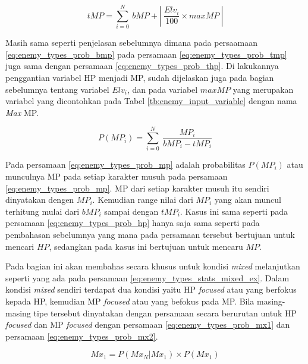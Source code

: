 \begin{equation}\label{eq:enemy_types_prob_tmp}
tMP = \sum_{i=0}^{N}\ bMP + \left |\ \frac{Elv_{i}}{100} \times maxMP\ \right |
\end{equation}

Masih sama seperti penjelasan sebelumnya dimana pada persaamaan \ref{eq:enemy_types_prob_bmp} pada persamaan \ref{eq:enemy_types_prob_tmp} juga sama dengan persamaan \ref{eq:enemy_types_prob_thp}. Di lakukannya penggantian variabel HP menjadi MP, sudah dijelaskan juga pada bagian sebelumnya tentang variabel $Elv_{i}$, dan pada variabel $maxMP$ yang merupakan variabel yang dicontohkan pada Tabel \ref{tb:enemy_input_variable} dengan nama \textit{Max} MP.
\vspace{2ex}

\begin{equation}\label{eq:enemy_types_prob_mp}
P(MP_{i}) = \sum_{i=0}^{N}\ \frac{MP_{i}}{bMP_{i} - tMP_{i}}
\end{equation}

Pada persamaan \ref{eq:enemy_types_prob_mp} adalah probabilitas $P(MP_{i})$ atau munculnya MP pada setiap karakter musuh pada persamaan \ref{eq:enemy_types_prob_mp}. MP dari setiap karakter musuh itu sendiri dinyatakan dengen $MP_{i}$. Kemudian range nilai dari $MP_{i}$ yang akan muncul terhitung mulai dari $bMP_{i}$ sampai dengan $tMP_{i}$. Kasus ini sama seperti pada persamaan \ref{eq:enemy_types_prob_hp} hanya saja sama seperti pada pembahasan sebelumnya yang mana pada persamaan tersebut bertujuan untuk mencari $HP$, sedangkan pada kasus ini bertujuan untuk mencaru $MP$.
\vspace{1ex}

Pada bagian ini akan membahas secara khusus untuk kondisi \textit{mixed} melanjutkan seperti yang ada pada persamaan \ref{eq:enemy_types_stats_mixed_ex}. Dalam kondisi \textit{mixed} sendiri terdapat dua kondisi yaitu HP \textit{focused} atau yang berfokus kepada HP, kemudian MP \textit{focused} atau yang befokus pada MP. Bila masing-masing tipe tersebut dinyatakan dengan persamaan secara berurutan untuk HP \textit{focused} dan MP \textit{focused} dengan persamaan \ref{eq:enemy_types_prob_mx1} dan persamaan \ref{eq:enemy_types_prob_mx2}. 
\vspace{1ex}

\begin{equation}\label{eq:enemy_types_prob_mx1}
Mx_{1} = P(Mx_{{N}}|Mx_{1}) \times P(Mx_{1})
\end{equation}


